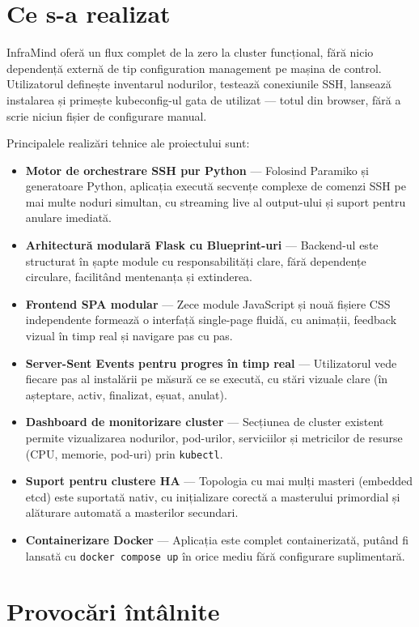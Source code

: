 \documentclass[12pt,a4paper]{report}
\begin{document}
\section*{Ce s-a realizat}

InfraMind oferă un flux complet de la zero la cluster funcțional, fără nicio dependență externă de tip configuration management pe mașina de control. Utilizatorul definește inventarul nodurilor, testează conexiunile SSH, lansează instalarea și primește kubeconfig-ul gata de utilizat — totul din browser, fără a scrie niciun fișier de configurare manual.

Principalele realizări tehnice ale proiectului sunt:

\begin{itemize}
  \item \textbf{Motor de orchestrare SSH pur Python} — Folosind Paramiko și generatoare Python, aplicația execută secvențe complexe de comenzi SSH pe mai multe noduri simultan, cu streaming live al output-ului și suport pentru anulare imediată.
  \item \textbf{Arhitectură modulară Flask cu Blueprint-uri} — Backend-ul este structurat în șapte module cu responsabilități clare, fără dependențe circulare, facilitând mentenanța și extinderea.
  \item \textbf{Frontend SPA modular} — Zece module JavaScript și nouă fișiere CSS independente formează o interfață single-page fluidă, cu animații, feedback vizual în timp real și navigare pas cu pas.
  \item \textbf{Server-Sent Events pentru progres în timp real} — Utilizatorul vede fiecare pas al instalării pe măsură ce se execută, cu stări vizuale clare (în așteptare, activ, finalizat, eșuat, anulat).
  \item \textbf{Dashboard de monitorizare cluster} — Secțiunea de cluster existent permite vizualizarea nodurilor, pod-urilor, serviciilor și metricilor de resurse (CPU, memorie, pod-uri) prin \texttt{kubectl}.
  \item \textbf{Suport pentru clustere HA} — Topologia cu mai mulți masteri (embedded etcd) este suportată nativ, cu inițializare corectă a masterului primordial și alăturare automată a masterilor secundari.
  \item \textbf{Containerizare Docker} — Aplicația este complet containerizată, putând fi lansată cu \texttt{docker compose up} în orice mediu fără configurare suplimentară.
\end{itemize}

\section*{Provocări întâlnite}
\end{document}

